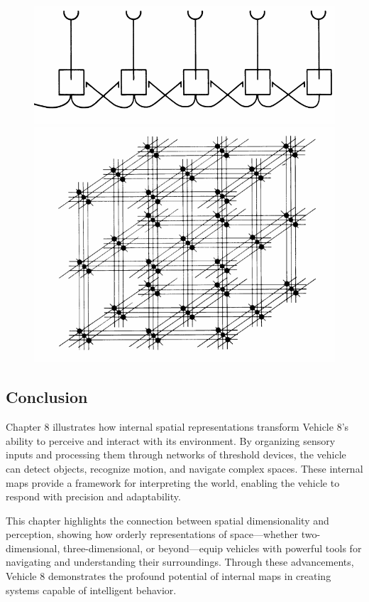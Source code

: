 \documentclass{article}
\begin{document}
	\begin{figure}
		\centering
		\begin{minipage}{.6\textwidth}
		  \centering
		  \includegraphics[width=.7\linewidth]{images/figure_14.png}
		\end{minipage}%
		\qquad
		\begin{minipage}{.6\textwidth}
		  \centering
		  \includegraphics[width=.7\linewidth]{images/figure_15.png}
		\end{minipage}
	\end{figure}

	\subsection*{Conclusion}

	Chapter 8 illustrates how internal spatial representations transform Vehicle 8's ability to perceive and interact with its environment. By organizing sensory inputs and processing them through networks of threshold devices, the vehicle can detect objects, recognize motion, and navigate complex spaces. These internal maps provide a framework for interpreting the world, enabling the vehicle to respond with precision and adaptability.

	This chapter highlights the connection between spatial dimensionality and perception, showing how orderly representations of space—whether two-dimensional, three-dimensional, or beyond—equip vehicles with powerful tools for navigating and understanding their surroundings. Through these advancements, Vehicle 8 demonstrates the profound potential of internal maps in creating systems capable of intelligent behavior.
\end{document}
